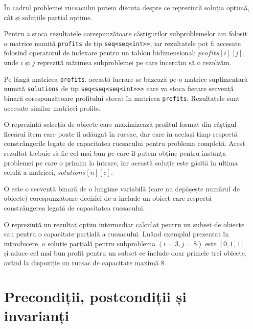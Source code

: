 \begin{sloppypar}
În cadrul problemei rucsacului putem discuta despre ce reprezintă soluția optimă, cât și soluțiile parțial optime. \par
Pentru a stoca rezultatele corespunzătoare câștigurilor subproblemelor am folosit o matrice numită \texttt{profits} de tip \texttt{seq<seq<int>>}, iar rezultatele pot fi accesate folosind operatorul de indexare pentru un tablou bidimensional: $profits[i][j]$, unde $i$ și $j$ reprezită mărimea subproblemei pe care încercăm să o rezolvăm.
\par
Pe lângă matricea \texttt{profits}, această lucrare se bazează pe o matrice suplimentară numită \texttt{solutions} de tip \texttt{seq<seq<seq<int>>>} care va stoca fiecare secvență binară corespunzătoare profitului stocat în matricea \texttt{profits}. Rezultatele sunt accesate similar matricei profits.
\par
O  reprezintă selecția de obiecte care maximizează profitul format din câștigul fiecărui item care poate fi adăugat în rucsac, dar care în același timp respectă constrângerile legate de capacitatea rucsacului pentru problema completă. Acest rezultat trebuie să fie cel mai bun pe care îl putem obține pentru instanța problemei pe care o primim la intrare, iar această soluție este găsită în ultima celulă a matricei, $solutions[n][c]$.
\par
O  este o secvență binară de o lungime variabilă (care nu depășește numărul de obiecte) corespunzătoare deciziei de a include un obiect care respectă constrângerea legată de capacitatea rucsacului. \par
O  reprezintă un rezultat optim intermediar calculat pentru un subset de obiecte sau pentru o capacitate parțială a rucsacului. Luând exemplul prezentat în introducere, o soluție parțială pentru subproblema $(i = 3, j = 8)$ este $[0, 1, 1]$ și aduce cel mai bun profit pentru un subset ce include doar primele trei obiecte, având la dispoziție un rucsac de capacitate maximă 8.

\section{Precondiții, postcondiții și invarianți}


\end{sloppypar}
